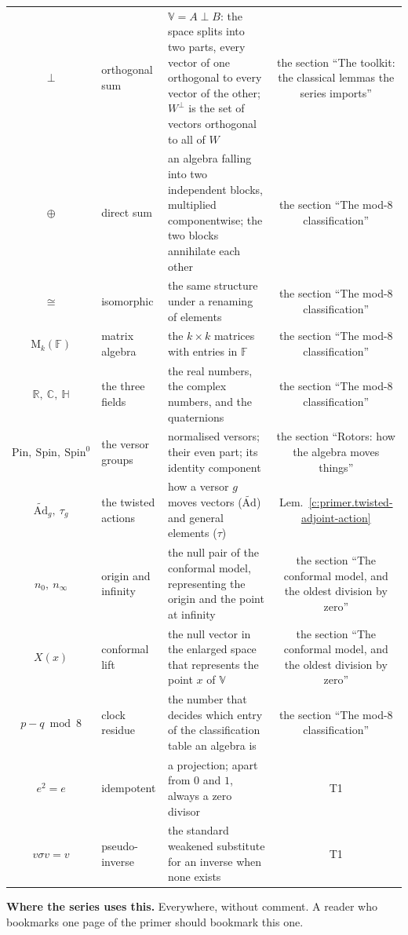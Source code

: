 \documentclass[11pt]{article}
\theoremstyle{definition}
\theoremstyle{plain}
\providecommand{\Ad}{}\renewcommand{\Ad}{\widetilde{\mathrm{Ad}}}
\providecommand{\C}{}\renewcommand{\C}{\mathbb{C}}
\providecommand{\HH}{}\renewcommand{\HH}{\mathbb{H}}
\providecommand{\Mat}{}\renewcommand{\Mat}{\mathrm{M}}
\providecommand{\Pin}{}\renewcommand{\Pin}{\mathrm{Pin}}
\providecommand{\R}{}\renewcommand{\R}{\mathbb{R}}
\providecommand{\Spin}{}\renewcommand{\Spin}{\mathrm{Spin}}
\begin{document}
\begin{center}
\begin{tabular}{cl>{ \arraybackslash}p{7.0cm}c}
$\perp$ & orthogonal sum & $\mathbb{V} = A \perp B$: the space splits into two parts, every vector of one orthogonal to every vector of the other; $W^{\perp}$ is the set of vectors orthogonal to all of $W$ & the section ``The toolkit: the classical lemmas the series imports'' \\
$\oplus$ & direct sum & an algebra falling into two independent blocks, multiplied componentwise; the two blocks annihilate each other & the section ``The mod-8 classification'' \\
$\cong$ & isomorphic & the same structure under a renaming of elements & the section ``The mod-8 classification'' \\
$\Mat_k(\mathbb{F})$ & matrix algebra & the $k \times k$ matrices with entries in $\mathbb{F}$ & the section ``The mod-8 classification'' \\
$\R,\ \C,\ \HH$ & the three fields & the real numbers, the complex numbers, and the quaternions & the section ``The mod-8 classification'' \\
$\Pin,\ \Spin,\ \Spin^0$ & the versor groups & normalised versors; their even part; its identity component & the section ``Rotors: how the algebra moves things'' \\
$\Ad_g,\ \tau_g$ & the twisted actions & how a versor $g$ moves vectors ($\Ad$) and general elements ($\tau$) & Lem.\ \ref{c:primer.twisted-adjoint-action} \\
$n_0,\ n_\infty$ & origin and infinity & the null pair of the conformal model, representing the origin and the point at infinity & the section ``The conformal model, and the oldest division by zero'' \\
$X(x)$ & conformal lift & the null vector in the enlarged space that represents the point $x$ of $\mathbb{V}$ & the section ``The conformal model, and the oldest division by zero'' \\
$p - q \bmod 8$ & clock residue & the number that decides which entry of the classification table an algebra is & the section ``The mod-8 classification'' \\
$e^2 = e$ & idempotent & a projection; apart from $0$ and $1$, always a zero divisor & T1 \\
$v\sigma v = v$ & pseudo-inverse & the standard weakened substitute for an inverse when none exists & T1 \\
\bottomrule
\end{tabular}
\end{center}

\label{c:note.primer.setting-notation-glance-2}
\textbf{Where the series uses this.} Everywhere, without comment. A reader who bookmarks one page of the primer should bookmark this one.
\end{document}
